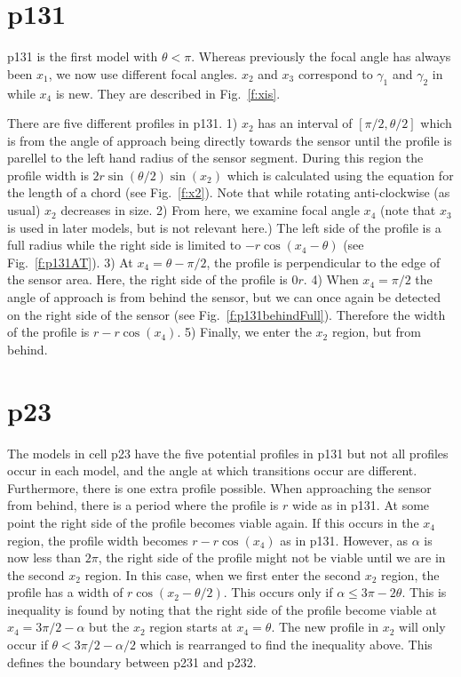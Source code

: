 \section{p131} \label{p131}

p131 is the first model with $\theta < \pi$. Whereas previously the focal angle has always been $x_1$, we now use different focal angles. $x_2$ and $x_3$ correspond to $\gamma_1$ and $\gamma_2$ in \cite{rowcliffe2008estimating} while $x_4$ is new. They are described in Fig.~\ref{f:xis}. 

There are five different profiles in p131. 1) $x_2$ has an interval of $[\pi/2, \theta/2]$ which is from the angle of approach being directly towards the sensor until the profile is parellel to the left hand radius of the sensor segment. During this region the profile width is $2r\sin\left(\theta/2\right)\sin(x_2)$ which is calculated using the equation for the length of a chord (see Fig.~\ref{f:x2}). Note that while rotating anti-clockwise (as usual) $x_2$ decreases in size. 2) From here, we examine focal angle $x_4$ (note that $x_3$ is used in later models, but is not relevant here.)  The left side of the profile is a full radius while the right side is limited to $- r\cos(x_4 - \theta)$ (see Fig.~\ref{f:p131AT}). 3) At $x_4 =  \theta - \pi/2$, the profile is perpendicular to the edge of the sensor area. Here, the right side of the profile is $0r$. 4) When $x_4 = \pi/2$ the angle of approach is from behind the sensor, but we can once again be detected on the right side of the sensor (see Fig.~\ref{f:p131behindFull}). Therefore the width of the profile is $r - r\cos(x_4)$. 5) Finally, we enter the $x_2$ region, but from behind. 



\section{p23} \label{p23}

The models in cell p23 have the five potential profiles in p131 but not all profiles occur in each model, and the angle at which transitions occur are different. Furthermore, there is one extra profile possible. When approaching the sensor from behind, there is a period where the profile is $r$ wide as in p131. At some point the right side of the profile becomes viable again. If this occurs in the $x_4$ region, the profile width becomes  $r - r\cos(x_4)$ as in p131. However, as $\alpha$ is now less than $2\pi$, the right side of the profile might not be viable until we are in the second $x_2$ region. In this case, when we first enter the second $x_2$ region, the profile has a width of $r\cos(x_2 - \theta/2)$. This occurs only if $\alpha \le 3\pi - 2\theta$. This is inequality is found by noting that the right side of the profile become viable at $x_4 = 3\pi/2 - \alpha$ but the $x_2$ region starts at $x_4 = \theta$. The new profile in $x_2$ will only occur if  $ \theta < 3\pi/2 - \alpha/2$ which is rearranged to find the inequality above. This defines the boundary between p231 and p232.

